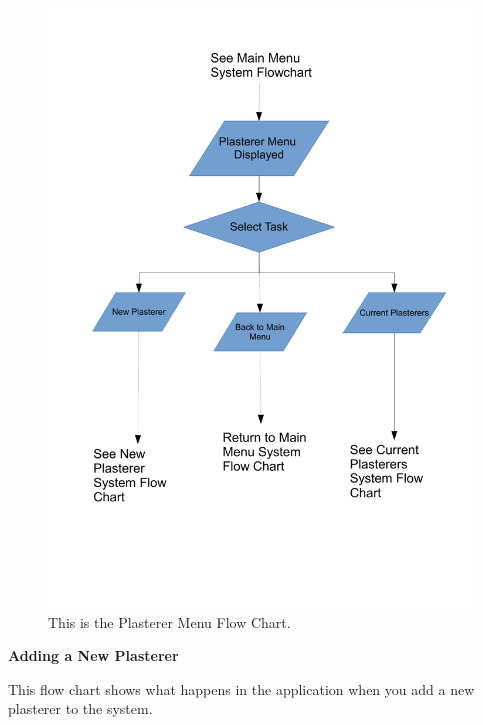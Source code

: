 \begin{figure}[H]
\includegraphics[scale=0.4]{./Design/images/FlowChartPlastererMenu.pdf}
    \caption{This is the Plasterer Menu Flow Chart.} 
\label{fig:FlowChartPlastererMenu}
\end{figure}


\pagebreak
\textbf{Adding a New Plasterer}
\begin{flushleft}
This flow chart shows what happens in the application when you add a new plasterer to the system.
\end{flushleft}


